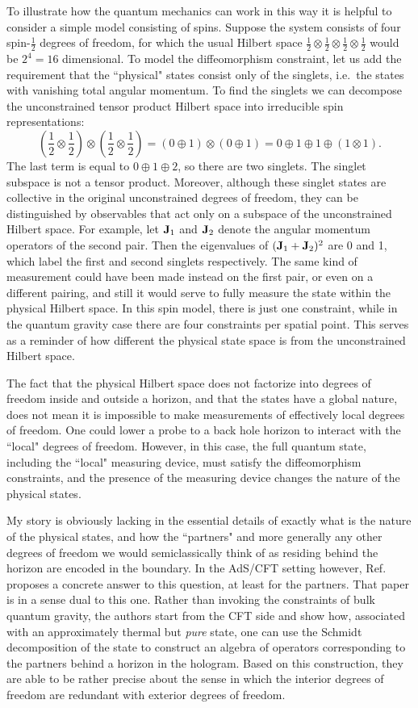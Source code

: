 \documentclass[12pt]{article}
\def\half{\textstyle\frac12}
\def\bJ{{\bf J}}
\begin{document}
{To illustrate how the quantum mechanics can work in this way it is helpful to consider 
a simple model consisting of spins. Suppose the system consists of four spin-$\half$ 
degrees of freedom, for which the usual Hilbert space $\half\otimes\half\otimes\half\otimes\half$
would be $2^4=16$ dimensional.  To model the diffeomorphism 
constraint, let us add the requirement that the ``physical" states consist only of the singlets, i.e.\ 
the states with vanishing total angular momentum. To find the singlets 
we can decompose the unconstrained tensor product Hilbert space into irreducible spin representations:
\[(\half\otimes\half)\otimes(\half\otimes\half) = (0\oplus1)\otimes(0\oplus1)= 
0\oplus1\oplus1\oplus(1\otimes1).\] 
The last term is equal to $0\oplus 1\oplus 2$, so there are two singlets. 
The singlet subspace is not a tensor product. Moreover, 
although these singlet states are collective in the original unconstrained
degrees of freedom, they can be distinguished by observables that act only on
a subspace of the unconstrained Hilbert space. 
For example, let $\bJ_1$ and $\bJ_2$ denote the angular momentum
operators of the second pair. Then the eigenvalues of $(\bJ_1+\bJ_2)^2$
are 0 and 1, which label the first and second singlets respectively. 
The same kind of measurement could have been made instead on the first
pair, or even on a different pairing, and still it would serve to fully
measure the state within the physical Hilbert space.
In this spin model, there is just one constraint,
while in the quantum gravity case there are four constraints per spatial point. 
This serves as a reminder of how different the physical state space is from 
the unconstrained Hilbert space.
 
The fact that the physical Hilbert space does not factorize into degrees of freedom 
inside and outside a horizon, and that the states have a global nature, does not mean it is impossible 
to make measurements of effectively local degrees of freedom. One could lower a probe to 
a back hole horizon to interact with the ``local" degrees of freedom. 
However, in this case, the full quantum state,
including the ``local" measuring device, must satisfy the diffeomorphism constraints, and
the presence of the measuring device changes the nature of the physical
states. 

My story is obviously lacking in
the essential details of exactly what is the nature of the physical states, and 
how the ``partners" and more generally any other
degrees of freedom we would semiclassically think of as residing behind the 
horizon are encoded in the boundary.
In the AdS/CFT setting however, Ref.~\cite{Papadodimas:2012aq} proposes a concrete answer to 
this question, at least for the partners. That paper is in a sense dual to this one.
Rather than invoking the constraints of bulk quantum gravity, the authors start from the CFT
side and show how, associated with an approximately thermal but \textit{pure} state, one can 
use the Schmidt decomposition of the state to construct 
an algebra of operators corresponding to the partners behind a horizon in the hologram.
Based on this construction, they are able to be rather precise about the sense in which 
the interior degrees of freedom are redundant with exterior degrees of freedom. 

}
\end{document}

